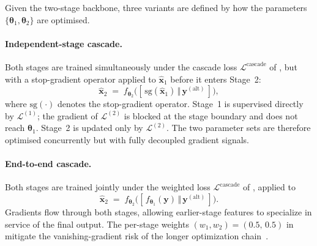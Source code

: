 Given the two-stage backbone, three variants are defined by how the parameters
$\{\boldsymbol{\theta}_1, \boldsymbol{\theta}_2\}$ are optimised.

\paragraph{Independent-stage cascade.}
Both stages are trained simultaneously under the cascade loss
$\mathcal{L}^{\mathrm{cascade}}$ of , but with a
stop-gradient operator applied to $\hat{\mathbf{x}}_{1}$ before it enters Stage~2:
\begin{equation}
    \hat{\mathbf{x}}_{2}
    \;=\; f_{\boldsymbol{\theta}_{2}}\!\bigl(
        [\,\mathrm{sg}(\hat{\mathbf{x}}_{1})\,\Vert\,\mathbf{y}^{(\mathrm{alt})}\,]
    \bigr),
    \label{eq:meth_ind_input}
\end{equation}
where $\mathrm{sg}(\cdot)$ denotes the stop-gradient operator. Stage~1 is supervised directly
by $\mathcal{L}^{(1)}$; the gradient of $\mathcal{L}^{(2)}$ is blocked at the stage boundary
and does not reach $\boldsymbol{\theta}_1$. Stage~2 is updated only by $\mathcal{L}^{(2)}$.
The two parameter sets are therefore optimised concurrently but with fully decoupled gradient
signals.

\paragraph{End-to-end cascade.}
Both stages are trained jointly under the weighted loss
$\mathcal{L}^{\mathrm{cascade}}$ of ,
applied to
\begin{equation}
    \hat{\mathbf{x}}_{2}
    \;=\; f_{\boldsymbol{\theta}_{2}}\!\bigl(
        [\,f_{\boldsymbol{\theta}_{1}}(\mathbf{y})\,\Vert\,\mathbf{y}^{(\mathrm{alt})}\,]
    \bigr).
    \label{eq:meth_e2e_input}
\end{equation}
Gradients flow through both stages, allowing earlier-stage features to specialize in service of the
final output. The per-stage weights $(w_{1}, w_{2}) = (0.5,\,0.5)$ in
 mitigate the vanishing-gradient risk of the longer optimization
chain~\cite{He2016}.

